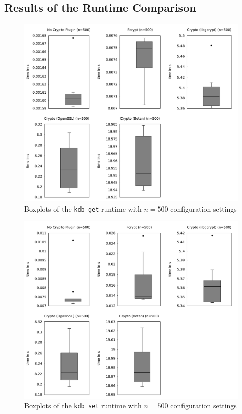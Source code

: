   \subsection{Results of the Runtime Comparison}


\begin{figure}[h]
\center
\caption{Boxplots of the \texttt{kdb get} runtime with $n = 500$ configuration settings}
\label{eval-boxplot-get}
\includegraphics[width=\columnwidth]{plots/boxplot_500_get.pdf}
\end{figure}

\begin{figure}[h]
\center
\caption{Boxplots of the \texttt{kdb set} runtime with $n = 500$ configuration settings}
\label{eval-boxplot-set}
\includegraphics[width=\columnwidth]{plots/boxplot_500_set.pdf}
\end{figure}


